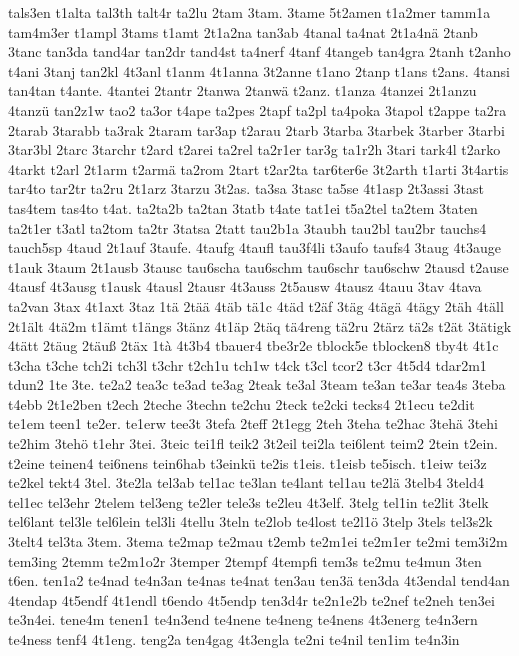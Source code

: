 {tals3en
t1alta
tal3th
talt4r
ta2lu
2tam
3tam.
3tame
5t2amen
t1a2mer
tamm1a
tam4m3er
t1ampl
3tams
t1amt
2t1a2na
tan3ab
4tanal
ta4nat
2t1a4nä
2tanb
3tanc
tan3da
tand4ar
tan2dr
tand4st
ta4nerf
4tanf
4tangeb
tan4gra
2tanh
t2anho
t4ani
3tanj
tan2kl
4t3anl
t1anm
4t1anna
3t2anne
t1ano
2tanp
t1ans
t2ans.
4tansi
tan4tan
t4ante.
4tantei
2tantr
2tanwa
2tanwä
t2anz.
t1anza
4tanzei
2t1anzu
4tanzü
tan2z1w
tao2
ta3or
t4ape
ta2pes
2tapf
ta2pl
ta4poka
3tapol
t2appe
ta2ra
2tarab
3tarabb
ta3rak
2taram
tar3ap
t2arau
2tarb
3tarba
3tarbek
3tarber
3tarbi
3tar3bl
2tarc
3tarchr
t2ard
t2arei
ta2rel
ta2r1er
tar3g
ta1r2h
3tari
tark4l
t2arko
4tarkt
t2arl
2t1arm
t2armä
ta2rom
2tart
t2ar2ta
tar6ter6e
3t2arth
t1arti
3t4artis
tar4to
tar2tr
ta2ru
2t1arz
3tarzu
3t2as.
ta3sa
3tasc
ta5se
4t1asp
2t3assi
3tast
tas4tem
tas4to
t4at.
ta2ta2b
ta2tan
3tatb
t4ate
tat1ei
t5a2tel
ta2tem
3taten
ta2t1er
t3atl
ta2tom
ta2tr
3tatsa
2tatt
tau2b1a
3taubh
tau2bl
tau2br
tauchs4
tauch5sp
4taud
2t1auf
3taufe.
4taufg
4taufl
tau3f4li
t3aufo
taufs4
3taug
4t3auge
t1auk
3taum
2t1ausb
3tausc
tau6scha
tau6schm
tau6schr
tau6schw
2tausd
t2ause
4tausf
4t3ausg
t1ausk
4tausl
2tausr
4t3auss
2t5ausw
4tausz
4tauu
3tav
4tava
ta2van
3tax
4t1axt
3taz
1tä
2tää
4täb
tä1c
4täd
t2äf
3täg
4tägä
4tägy
2täh
4täll
2t1ält
4tä2m
t1ämt
t1ängs
3tänz
4t1äp
2täq
tä4reng
tä2ru
2tärz
tä2s
t2ät
3tätigk
4tätt
2täug
2täuß
2täx
1tà
4t3b4
tbauer4
tbe3r2e
tblock5e
tblocken8
tby4t
4t1c
t3cha
t3che
tch2i
tch3l
t3chr
t2ch1u
tch1w
t4ck
t3cl
tcor2
t3cr
4t5d4
tdar2m1
tdun2
1te
3te.
te2a2
tea3c
te3ad
te3ag
2teak
te3al
3team
te3an
te3ar
tea4s
3teba
t4ebb
2t1e2ben
t2ech
2teche
3techn
te2chu
2teck
te2cki
tecks4
2t1ecu
te2dit
te1em
teen1
te2er.
te1erw
tee3t
3tefa
2teff
2t1egg
2teh
3teha
te2hac
3tehä
3tehi
te2him
3tehö
t1ehr
3tei.
3teic
tei1fl
teik2
3t2eil
tei2la
tei6lent
teim2
2tein
t2ein.
t2eine
teinen4
tei6nens
tein6hab
t3einkü
te2is
t1eis.
t1eisb
te5isch.
t1eiw
tei3z
te2kel
tekt4
3tel.
3te2la
tel3ab
tel1ac
te3lan
te4lant
tel1au
te2lä
3telb4
3teld4
tel1ec
tel3ehr
2telem
tel3eng
te2ler
tele3s
te2leu
4t3elf.
3telg
tel1in
te2lit
3telk
tel6lant
tel3le
tel6lein
tel3li
4tellu
3teln
te2lob
te4lost
te2l1ö
3telp
3tels
tel3s2k
3telt4
tel3ta
3tem.
3tema
te2map
te2mau
t2emb
te2m1ei
te2m1er
te2mi
tem3i2m
tem3ing
2temm
te2m1o2r
3temper
2tempf
4tempfi
tem3s
te2mu
te4mun
3ten
t6en.
ten1a2
te4nad
te4n3an
te4nas
te4nat
ten3au
ten3ä
ten3da
4t3endal
tend4an
4tendap
4t5endf
4t1endl
t6endo
4t5endp
ten3d4r
te2n1e2b
te2nef
te2neh
ten3ei
te3n4ei.
tene4m
tenen1
te4n3end
te4nene
te4neng
te4nens
4t3energ
te4n3ern
te4ness
tenf4
4t1eng.
teng2a
ten4gag
4t3engla
te2ni
te4nil
ten1im
te4n3in
}
